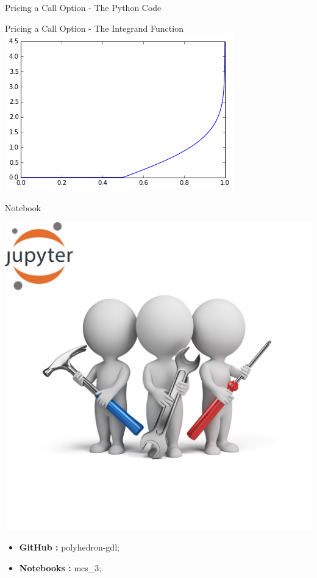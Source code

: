 \documentclass[11pt]{beamer}
\begin{document}
\begin{frame}{Pricing a Call Option - The Python Code}

\end{frame}
\begin{frame}{Pricing a Call Option - The Integrand Function}
\includegraphics[scale=.75]{img/bs_integrand_function.png} 
\end{frame}
\begin{frame}{Notebook}
\noindent\begin{minipage}{0.5\textwidth}%
\includegraphics[width=\linewidth]{img/exercise.jpg}
\end{minipage}%
\hfill%
\begin{minipage}{0.5\textwidth}
\begin{itemize}
\item {\bf GitHub        : }    polyhedron-gdl;
\item {\bf Notebooks  : }    mcs\_3;
\end{itemize}
\end{minipage}
\end{frame}
\end{document}
